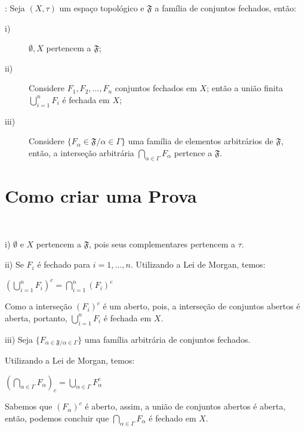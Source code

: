 \begin{teo}: Seja $(X,\tau)$ um espaço topológico e $ \mathfrak{F}$ a
família de conjuntos fechados, então:
\begin{description}
  \item[i)]$\emptyset, X$ pertencem a $ \mathfrak{F}$;
  \item[ii)]Considere $F_{1}, F_{2},..., F_{n}$ conjuntos fechados
  em $X$; então a união finita $\bigcup\limits_{i=1}^{n} F_{i}$ é fechada
  em $X$;
  \item[iii)]Considere $\{ F_{\alpha} \in \mathfrak{F} / \alpha \in
  \Gamma\}$ uma família de elementos arbitrários de $\mathfrak{F}$,
  então, a interseção arbitrária $\bigcap\limits_{\alpha \in \Gamma}F_{\alpha}$ pertence a $\mathfrak{F}.$
\end{description}
\end{teo}

\section{Como criar uma Prova}

 \begin{prova}~

 \item i) $\emptyset$ e $X$ pertencem a $\mathfrak{F}$, pois seus
   complementares pertencem a $\tau$.
 \item ii) Se $F_{i}$ é fechado para $i = 1,...,n$. Utilizando a Lei de Morgan, temos:
   \begin{center}
   $(\bigcup\limits_{i=1}^{n} F_{i})^{c} = \bigcap\limits_{i=1}^{n} (F_{i})^{c}$
   \end{center}
   
   Como a interseção $(F_{i})^{c}$ é  um aberto, pois, a interseção
   de conjuntos abertos é aberta, portanto, $\bigcup\limits_{i=1}^{n} F_{i}$ é fechada
   em $X.$
  \item iii) Seja $\{F_{\alpha \in \mathfrak{F} / \alpha \in
   \Gamma}\}$ uma família arbitrária de conjuntos fechados.

  Utilizando a Lei de Morgan, temos:
   \begin{center}
   $(\bigcap_{\alpha \in \Gamma} F_{\alpha})_{c} = \bigcup\limits_{\alpha \in
   \Gamma} F_{\alpha}^{c}$
   \end{center}
   
   Sabemos que $(F_{\alpha})^{c}$ é aberto, assim, a união de
   conjuntos abertos é aberta, então, podemos concluir que $\bigcap\limits_{\alpha \in
   \Gamma}F_{\alpha}$ é fechado em $X$.
 \end{prova}
